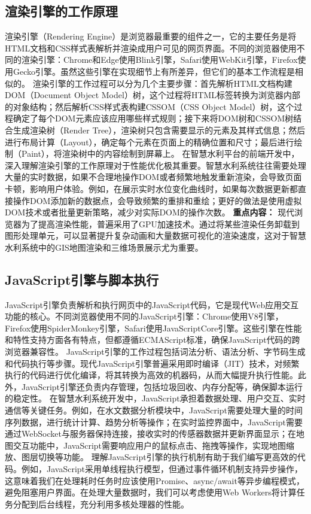 \subsection{渲染引擎的工作原理}\label{ux6e32ux67d3ux5f15ux64ceux7684ux5de5ux4f5cux539fux7406} 渲染引擎（Rendering
Engine）是浏览器最重要的组件之一，它的主要任务是将HTML文档和CSS样式表解析并渲染成用户可见的网页界面。不同的浏览器使用不同的渲染引擎：Chrome和Edge使用Blink引擎，Safari使用WebKit引擎，Firefox使用Gecko引擎。虽然这些引擎在实现细节上有所差异，但它们的基本工作流程是相似的。
渲染引擎的工作过程可以分为几个主要步骤：首先解析HTML文档构建DOM（Document Object Model）树，这个过程将HTML标签转换为浏览器内部的对象结构；然后解析CSS样式表构建CSSOM（CSS Object
Model）树，这个过程确定了每个DOM元素应该应用哪些样式规则；接下来将DOM树和CSSOM树结合生成渲染树（Render
Tree），渲染树只包含需要显示的元素及其样式信息；然后进行布局计算（Layout），确定每个元素在页面上的精确位置和尺寸；最后进行绘制（Paint），将渲染树中的内容绘制到屏幕上。
在智慧水利平台的前端开发中，深入理解渲染引擎的工作原理对于性能优化极其重要。智慧水利系统往往需要处理大量的实时数据，如果不合理地操作DOM或者频繁地触发重新渲染，会导致页面卡顿，影响用户体验。例如，在展示实时水位变化曲线时，如果每次数据更新都直接操作DOM添加新的数据点，会导致频繁的重排和重绘；更好的做法是使用虚拟DOM技术或者批量更新策略，减少对实际DOM的操作次数。
\textbf{重点内容：} 现代浏览器为了提高渲染性能，普遍采用了GPU加速技术。通过将某些渲染任务卸载到图形处理单元，可以显著提升复杂动画和大量数据可视化的渲染速度，这对于智慧水利系统中的GIS地图渲染和三维场景展示尤为重要。
\subsection{JavaScript引擎与脚本执行}\label{javascriptux5f15ux64ceux4e0eux811aux672cux6267ux884c}
JavaScript引擎负责解析和执行网页中的JavaScript代码，它是现代Web应用交互功能的核心。不同浏览器使用不同的JavaScript引擎：Chrome使用V8引擎，Firefox使用SpiderMonkey引擎，Safari使用JavaScriptCore引擎。这些引擎在性能和特性支持方面各有特点，但都遵循ECMAScript标准，确保JavaScript代码的跨浏览器兼容性。
JavaScript引擎的工作过程包括词法分析、语法分析、字节码生成和代码执行等步骤。现代JavaScript引擎普遍采用即时编译（JIT）技术，对频繁执行的代码进行优化编译，将其转换为高效的机器码，从而大幅提升执行性能。此外，JavaScript引擎还负责内存管理，包括垃圾回收、内存分配等，确保脚本运行的稳定性。
在智慧水利系统开发中，JavaScript承担着数据处理、用户交互、实时通信等关键任务。例如，在水文数据分析模块中，JavaScript需要处理大量的时间序列数据，进行统计计算、趋势分析等操作；在实时监控界面中，JavaScript需要通过WebSocket与服务器保持连接，接收实时的传感器数据并更新界面显示；在地图交互功能中，JavaScript需要响应用户的鼠标点击、拖拽等操作，实现地图缩放、图层切换等功能。
理解JavaScript引擎的执行机制有助于我们编写更高效的代码。例如，JavaScript采用单线程执行模型，但通过事件循环机制支持异步操作，这意味着我们在处理耗时任务时应该使用Promise、async/await等异步编程模式，避免阻塞用户界面。在处理大量数据时，我们可以考虑使用Web
Workers将计算任务分配到后台线程，充分利用多核处理器的性能。
